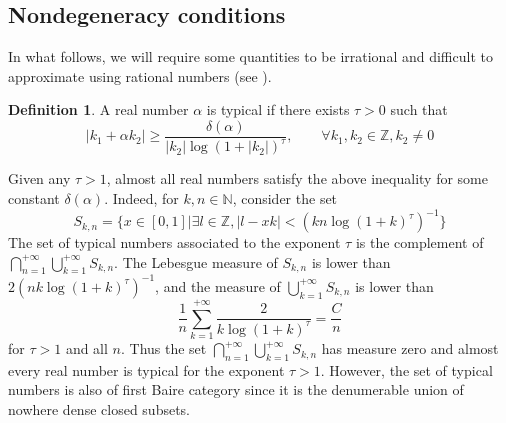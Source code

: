 \documentclass[12pt]{amsart}
\numberwithin{equation}{subsection}
\theoremstyle{definition}
\newtheorem{definition}[equation]{Definition}
\theoremstyle{plain}
\begin{document}
\subsection{Nondegeneracy conditions}
\label{generic} In what follows, we will require some quantities to
be irrational and difficult to approximate using rational numbers
(see \cite[section 11]{1}).
\begin{definition}
\label{typicalnum}
A real number $\alpha$ is typical if there exists $\tau > 0$ such that
\[
\left| k_1 + \alpha k_2 \right| \geq \frac{\delta(\alpha)}{|k_2| \log(1+|k_2|)^{\tau}}, \qquad \forall k_1,k_2 \in \mathbb Z, k_2 \neq 0
\]
\end{definition}
Given any $\tau > 1$, almost all real numbers satisfy the above inequality for some constant $\delta(\alpha)$.
Indeed, for $k,n \in \mathbb N$, consider the set
\[
S_{k,n}=\{x \in [0,1]| \exists l \in \mathbb Z, |l-xk|<(kn \log(1+k)^{\tau})^{-1} \}
\]
The set of typical numbers
associated to the exponent $\tau$ is the complement of $\bigcap_{n=1}^{+\infty}
\bigcup_{k=1}^{+\infty} S_{k,n}$.
The Lebesgue measure of $S_{k,n}$ is lower than $2(nk \log(1+k)^{\tau})^{-1}$, and
the measure of $\bigcup_{k=1}^{+\infty} S_{k,n}$ is lower than
\[
\frac{1}{n} \sum_{k=1}^{+\infty} \frac{2}{k \log(1+k)^{\tau}} = \frac{C}{n}
\]
for $\tau > 1$ and
all $n$. Thus the set $\bigcap_{n=1}^{+\infty} \bigcup_{k=1}^{+\infty} S_{k,n}$ has measure zero
and almost every real number is typical for the exponent $\tau > 1$. However, the set of typical
numbers is also of first Baire category since it is the denumerable union of nowhere dense closed subsets.
\end{document}
